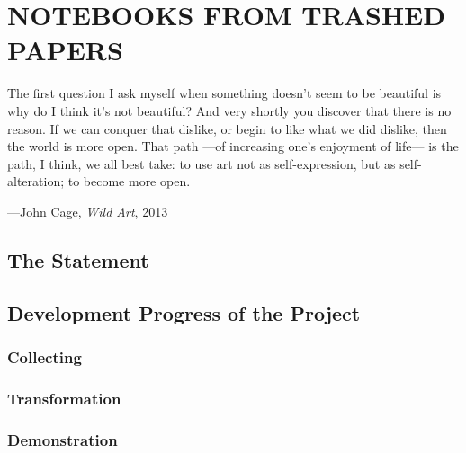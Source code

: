 \chapter{NOTEBOOKS FROM TRASHED PAPERS}



\begin{singlespace}
\epigraph{The first question I ask myself when something doesn’t seem to be beautiful is why do I think it’s not beautiful? And very shortly you discover that there is no reason. If we can conquer that dislike, or begin to like what we did dislike, then the world is more open. That path ---of increasing one’s enjoyment of life--- is the path, I think, we all best take: to use art not as self-expression, but as self-alteration; to become more open.}{\hfill---John Cage, \textit{Wild Art}, 2013}
\end{singlespace}



\lipsum[1-1]



\section{The Statement}

\lipsum[2-2]


\section{Development Progress of the Project}

\lipsum[3-3]


\subsection{Collecting}

\lipsum[4-4]



\subsection{Transformation}

\lipsum[5-5]


\subsection{Demonstration}

